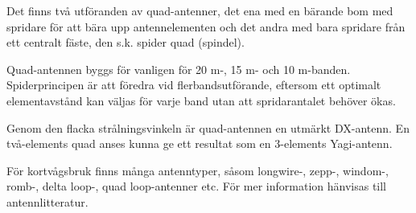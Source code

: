 Det finns två utföranden av quad-antenner, det ena med en bärande bom
med spridare för att bära upp antennelementen och det andra med bara
spridare från ett centralt fäste, den s.k. spider quad (spindel).

Quad-antennen byggs för vanligen för 20 m-, 15 m- och 10
m-banden. Spiderprincipen är att föredra vid flerbandsutförande,
eftersom ett optimalt elementavstånd kan väljas för varje band utan
att spridarantalet behöver ökas.

Genom den flacka strålningsvinkeln är quad-antennen en utmärkt
DX-antenn. En två-elements quad anses kunna ge ett resultat som en
3-elements Yagi-antenn.

För kortvågsbruk finns många antenntyper, såsom longwire-, zepp-,
windom-, romb-, delta loop-, quad loop-antenner etc. För mer
information hänvisas till antennlitteratur.
